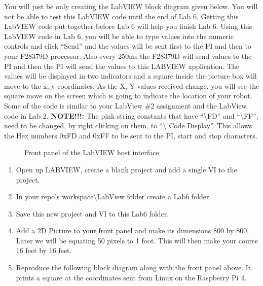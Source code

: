\documentclass[11pt]{article}
\begin{document}
You will just be only creating the LabVIEW block diagram given below. You will not be able to test this LabVIEW code until the end of Lab 6. Getting this LabVIEW code put together before Lab 6 will help you finish Lab 6. Using this LabVIEW code in Lab 6, you will be able to type values into the numeric controls and click “Send” and the values will be sent first to the PI and then to your F28379D processor. Also every 250ms the F28379D will send values to the PI and then the PI will send the values to this LABVIEW application. The values will be displayed in two indicators and a square inside the picture box will move to the x, y coordinates. As the X, Y values received change, you will see the square move on the screen which is going to indicate the location of your robot. Some of the code is similar to your LabView \#2 assignment and the LabView code in Lab 2. \textbf{NOTE!!!:} The pink string constants that have “\textbackslash FD” and “\textbackslash FF”, need to be changed, by right clicking on them, to “\textbackslash{} Code Display”. This allows the Hex numbers 0xFD and 0xFF to be sent to the PI, start and stop characters.
%
\begin{figure}[H]
    \centering
    \caption{Front panel of the LabVIEW host interface}
\end{figure}
%
\begin{enumerate}
    \item Open up LABVIEW, create a blank project and add a single VI to the project.
    \item In your repo’s workspace\textbackslash LabView folder create a Lab6 folder.
    \item Save this new project and VI to this Lab6 folder.
    \item Add a 2D Picture to your front panel and make its dimensions 800 by 800. Later we will be equating 50 pixels to 1 foot. This will then make your course 16 feet by 16 feet.
    \item Reproduce the following block diagram along with the front panel above. It prints a square at the coordinates sent from Linux on the Raspberry Pi 4.
\end{enumerate}
\end{document}
